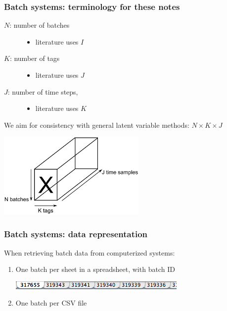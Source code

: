 \begin{frame}\frametitle{Batch systems: terminology for these notes}

\begin{description} 
	
	\item[ \( N \): number of batches] 
	
		\begin{itemize}
			\item	literature uses \( I \)
		\end{itemize}
		
	\item[\( K \): number of tags] 
	
		\begin{itemize}
			\item	 literature uses \( J \)
		\end{itemize}
	
	\item[\( J \): number of time steps, ] 
	
		\begin{itemize}
			\item	 literature uses \( K \)
		\end{itemize}
\end{description}

We aim for consistency with general latent variable methods: \( N \times K \times J \)

\begin{center}
	\includegraphics[width=7.2cm]{images/batch-data-cube.png}
\end{center}

\end{frame}

\begin{frame}\frametitle{Batch systems: data representation}

When retrieving batch data from computerized systems:
\begin{enumerate}
	\item	One batch per sheet in a spreadsheet, with batch ID
			
			\includegraphics[scale=0.75]{images/batches-in-spreadsheets.png}
	
	\item	One batch per CSV file
\end{enumerate}
\end{frame}

